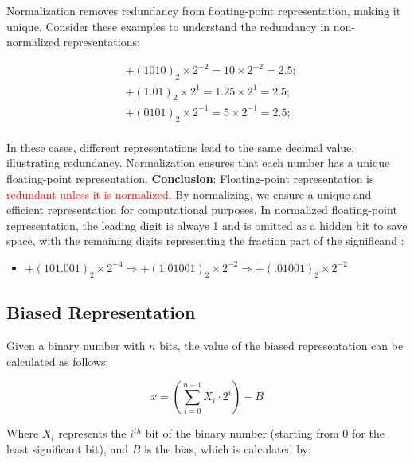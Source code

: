 \documentclass[12pt,openany, tikz,border=10pt]{book}
\begin{document}
			      	Normalization removes redundancy from floating-point representation, making it unique. Consider these examples to understand the redundancy in non-normalized representations:
			      	
			      	\[
			      		\begin{aligned}
			      			  & + (1010)_2 \times 2^{-2} = 10 \times 2^{-2} = 2.5; \\
			      			  & + (1.01)_2 \times 2^{1} = 1.25 \times 2^{1} = 2.5; \\
			      			  & + (0101)_2 \times 2^{-1} = 5 \times 2^{-1}  = 2.5; \\
			      		\end{aligned}
			      	\]
			      	
			      	    
			      	In these cases, different representations lead to the same decimal value, illustrating redundancy. Normalization ensures that each number has a unique floating-point representation. 
			      	\vskip 0.5cm
			      	\textbf{Conclusion}: Floating-point representation is \textcolor{red}{redundant unless it is normalized}. By normalizing, we ensure a unique and efficient representation for computational purposes.
			      	\vskip 0.5cm
			      	In normalized floating-point representation, the leading digit is always 1 and is omitted as a hidden bit to save space, with the remaining digits representing the fraction part of the significand :
			      	\begin{itemize}
			      		\item[] \( +(101.001)_2 \times 2^{-4} \Rightarrow +(1.01001)_2 \times 2^{-2} \Rightarrow +(.01001)_2 \times 2^{-2} \)
			      	\end{itemize}
			      	
			      	
			      	
			      	
			      	\newpage
			      	\subsection{Biased Representation}
			      	
			      	Given a binary number with $n$ bits, the value of the biased representation can be calculated as follows:
			      	
			      	\[
			      		x = (\sum_{i=0}^{n-1} X_i \cdot 2^i) - B
			      	\]
			      	
			      	Where $X_i$ represents the $i^{th}$ bit of the binary number (starting from 0 for the least significant bit), and $B$ is the bias, which is calculated by:
			      	
\end{document}
